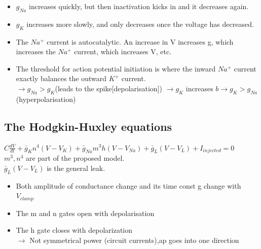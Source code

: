 \documentclass[english,11pt]{article}
\begin{document}
\begin{itemize}
\item $g_{Na}$ increases quickly, but then inactivation kicks in and it decreases again.
\item $g_K$ increases more slowly, and only decreases once the voltage has decreased.
\item The $Na^+$ current is autocatalytic. An increase
in V increases g, which increases the $Na^+$
current, which increases V, etc.
\item The threshold for action potential
initiation is where the inward $Na^+$ current
exactly balances the outward $K^+$ current.\\
$\rightarrow g_{Na} > g_K $(leads to the spike[depolarisation]) $\rightarrow g_{K}$ increases $ b                                                                         \rightarrow g_{K} > g_{Na} $(hyperpolarisation)\\
\end{itemize}

\subsection{The Hodgkin-Huxley equations}
$C\frac{dV}{dt} + \bar{g}_{K}n^4 (V-V_K)+\bar{g}_{Na}m^3 h(V-V_{Na})+\bar{g}_L(V-V_L) + I_{injected} = 0$\\
\textbf{$m^3,n^4$} are part of the proposed model.\\
$\bar{g}_L(V-V_L)$ is the general leak.
\begin{itemize}
\item Both amplitude of conductance change and its time const g change with $V_{clamp}$
\item The m and n gates open with depolarisation
\item The h gate closes with depolarization\\
$\rightarrow$ Not symmetrical power (circuit currents),ap goes into one direction
\end{itemize}
\end{document}
